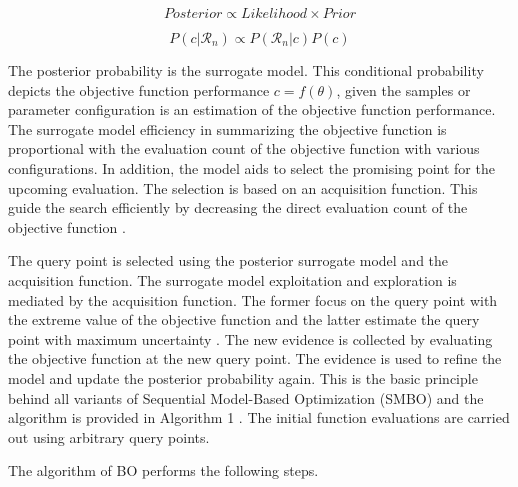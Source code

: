 \begin{equation}
Posterior \propto Likelihood \times Prior
\end{equation}

\begin{equation}
P\left(c | \mathcal{R}_{n}\right) \propto P\left(\mathcal{R}_{n} | c\right) P(c)
\end{equation}


The posterior probability is the surrogate model. This conditional probability depicts the objective function performance $c=f(\theta)$, given the samples or parameter configuration is an estimation of the objective function performance. The surrogate model efficiency in summarizing the objective function is proportional with the evaluation count of the objective function with various configurations. In addition, the model aids to select the promising point for the upcoming evaluation. The selection is based on an acquisition function. This guide the search efficiently by decreasing the direct evaluation count of the objective function \cite{Bayesianoptimization_review} \cite{BayesianOptimization_papertutorials}. 

The query point is selected using the posterior surrogate model and the acquisition function. The surrogate model exploitation and exploration is mediated by the acquisition function. The former focus on the query point with the extreme value of the objective function and the latter estimate the query point with maximum uncertainty \cite{Bayesianoptimization_review} \cite{BayesianOptimization_papertutorials}. The new evidence is collected by evaluating the objective function at the new query point. The evidence is used to refine the model and update the posterior probability again. This is the basic principle behind all variants of Sequential Model-Based Optimization (SMBO) and the algorithm is provided in Algorithm 1 \cite{BayesianOptimization_papertutorials}. The initial function evaluations are carried out using arbitrary query points.


The algorithm of BO performs the following steps.


